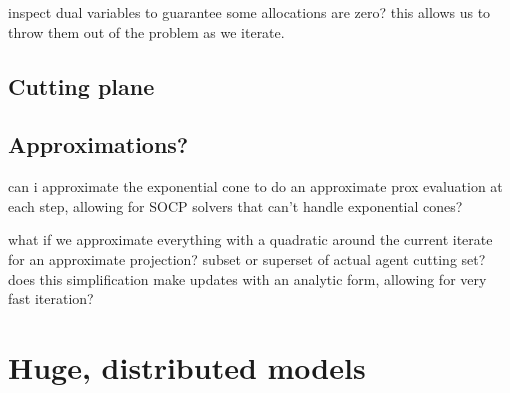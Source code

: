 \documentclass{article}
\begin{document}
inspect dual variables to guarantee some allocations are zero? this allows us to throw them out of the problem as we iterate.

\subsection{Cutting plane}
\subsection{Approximations?}
can i approximate the exponential cone to do an approximate prox evaluation
at each step, allowing for SOCP solvers that can't handle exponential cones?

what if we approximate everything with a quadratic around the current iterate for an approximate projection? subset or superset of actual agent cutting set? does this simplification make updates with an analytic form, allowing for very fast iteration?

\section{Huge, distributed models}

\newpage


\end{document}
